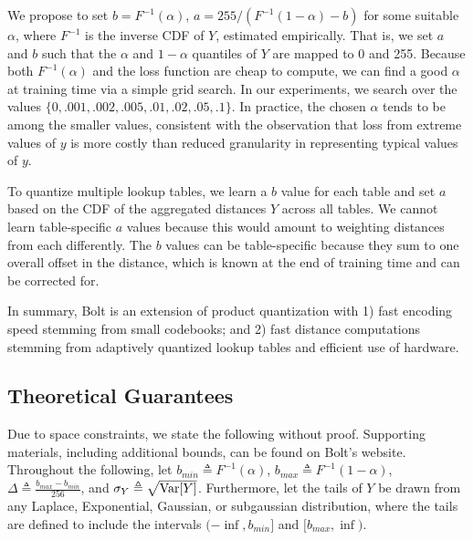 We propose to set $b = F^{-1}(\alpha)$, $a = 255 / (F^{-1}(1 - \alpha) - b)$ for some suitable $\alpha$, where $F^{-1}$ is the inverse CDF of $Y$, estimated empirically. That is, we set $a$ and $b$ such that the $\alpha$ and $1 - \alpha$ quantiles of $Y$ are mapped to 0 and 255. Because both $F^{-1}(\alpha)$ and the loss function are cheap to compute, we can find a good $\alpha$ at training time via a simple grid search. In our experiments, we search over the values $\{0, .001, .002, .005, .01, .02, .05, .1\}$. In practice, the chosen $\alpha$ tends to be among the smaller values, consistent with the observation that loss from extreme values of $y$ is more costly than reduced granularity in representing typical values of $y$.

To quantize multiple lookup tables, we learn a $b$ value for each table and set $a$ based on the CDF of the aggregated distances $Y$ across all tables. We cannot learn table-specific $a$ values because this would amount to weighting distances from each differently. The $b$ values can be table-specific because they sum to one overall offset in the distance, which is known at the end of training time and can be corrected for.


In summary, Bolt is an extension of product quantization with 1) fast encoding speed stemming from small codebooks; and 2) fast distance computations stemming from adaptively quantized lookup tables and efficient use of hardware.

\subsection{Theoretical Guarantees}

Due to space constraints, we state the following without proof. Supporting materials, including additional bounds, can be found on Bolt's website. %
Throughout the following, let $b_{min} \triangleq F^{-1}(\alpha)$, $b_{max} \triangleq F^{-1}(1 - \alpha)$, $\Delta \triangleq \frac{b_{max} - b_{min} }{ 256 }$, and $\sigma_Y \triangleq \sqrt{\operatorname{Var}[Y]}$. Furthermore, let the tails of $Y$ be drawn from any Laplace, Exponential, Gaussian, or subgaussian distribution, where the tails are defined to include the intervals $(-\inf, b_{min}]$ and $[b_{max}, \inf)$.


